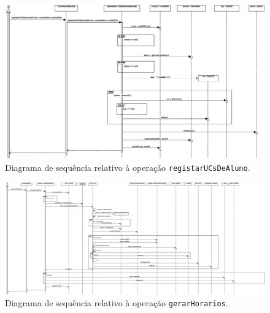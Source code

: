 \documentclass[12pt, a4paper]{article}
\begin{document}
\begin{landscape}
        \vspace*{\fill}
        \pagebreak
        \vspace*{\fill}

        \begin{figure}[H]
            \centering
            \includegraphics[scale=0.65]{Imagens/Modelos/registarUCsDeAlunoDAO.svg.eps}
            \caption{
                Diagrama de sequência relativo à operação \texttt{registarUCsDeAluno}.
            }
        \end{figure}

        \vspace*{\fill}
        \pagebreak
        \vspace*{\fill}

        \begin{figure}[H]
            \centering
            \includegraphics[scale=0.33]{Imagens/Modelos/gerarHorariosDAO.svg.eps}
            \caption{
                Diagrama de sequência relativo à operação \texttt{gerarHorarios}.
            }
        \end{figure}

        \vspace*{\fill}
        \pagebreak
        \vspace*{\fill}


\end{landscape}
\end{document}
